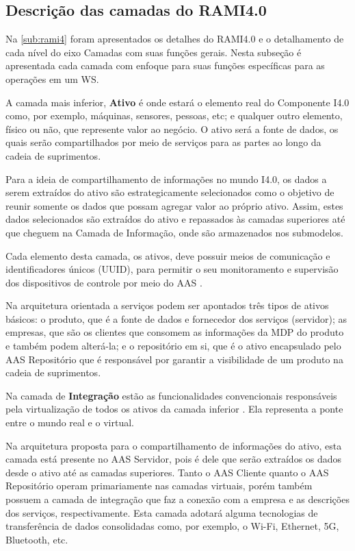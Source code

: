 \subsection{Descrição das camadas do RAMI4.0}

	Na \autoref{sub:rami4} foram apresentados os detalhes do RAMI4.0 e o detalhamento de cada nível do eixo Camadas com suas funções gerais. Nesta subseção é apresentada cada camada com enfoque para suas funções específicas para as operações em um WS.

	A camada mais inferior, \textbf{Ativo} é onde estará o elemento real do Componente I4.0 como, por exemplo, máquinas, sensores, pessoas, etc; e qualquer outro elemento, físico ou não, que represente valor ao negócio. O ativo será a fonte de dados, os quais serão compartilhados por meio de serviços para as partes ao longo da cadeia de suprimentos.
	
	Para a ideia de compartilhamento de informações no mundo I4.0, os dados a serem extraídos do ativo são estrategicamente selecionados como o objetivo de reunir somente os dados que possam agregar valor ao próprio ativo. Assim, estes dados selecionados são extraídos do ativo e repassados às camadas superiores até que cheguem na Camada de Informação, onde são armazenados nos submodelos.
	
	Cada elemento desta camada, os ativos, deve possuir meios de comunicação e identificadores únicos (UUID), para permitir o seu monitoramento e supervisão dos dispositivos de controle por meio do AAS \cite{adolphs2015rami}.
	
	Na arquitetura orientada a serviços podem ser apontados três tipos de ativos básicos: o produto, que é a fonte de dados e fornecedor dos serviços (servidor); as empresas, que são os clientes que consomem as informações da MDP do produto e também podem alterá-la; e o repositório em si, que é o ativo encapsulado pelo AAS Repositório que é responsável por garantir a visibilidade de um produto na cadeia de suprimentos.
	
	Na camada de \textbf{Integração} estão as funcionalidades convencionais responsáveis pela virtualização de todos os ativos da camada inferior \cite{adolphs2015rami}. Ela representa a ponte entre o mundo real e o virtual.
	
	Na arquitetura proposta para o compartilhamento de informações do ativo, esta camada está presente no AAS Servidor, pois é dele que serão extraídos os dados desde o ativo até as camadas superiores. Tanto o AAS Cliente quanto o AAS Repositório operam primariamente nas camadas virtuais, porém também possuem a camada de integração que faz a conexão com a empresa e as descrições dos serviços, respectivamente. Esta camada adotará alguma tecnologias de transferência de dados consolidadas como, por exemplo, o Wi-Fi, Ethernet, 5G, Bluetooth, etc.
	
